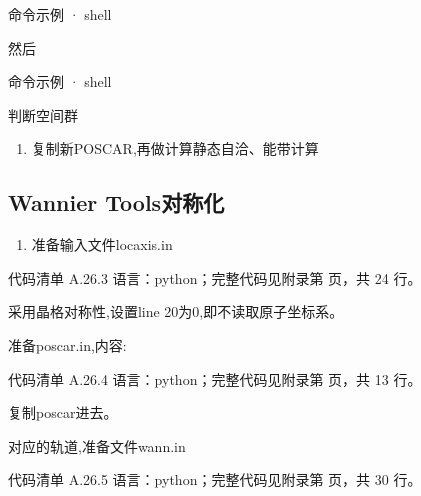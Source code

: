 \documentclass[lang=cn,scheme=chinese,color=blue,device=normal,toc=onecol,math=cm]{elegantbook}
\begin{document}
\begin{inlinecodebox}{命令示例 · shell}
\end{inlinecodebox}


然后\par


\begin{inlinecodebox}{命令示例 · shell}
\end{inlinecodebox}


判断空间群\par


\begin{enumerate}
\item 复制新POSCAR,再做计算静态自洽、能带计算
\end{enumerate}


\subsection{Wannier Tools对称化}


\begin{enumerate}
\item 准备输入文件locaxis.in
\end{enumerate}


\begin{codeindexbox}{代码清单 A.26.3}
语言：python；完整代码见附录第 \pageref{code:26:3} 页，共 24 行。
\end{codeindexbox}


采用晶格对称性,设置line 20为0,即不读取原子坐标系。\par


准备poscar.in,内容:\par


\begin{codeindexbox}{代码清单 A.26.4}
语言：python；完整代码见附录第 \pageref{code:26:4} 页，共 13 行。
\end{codeindexbox}


复制poscar进去。\par


对应的轨道,准备文件wann.in\par


\begin{codeindexbox}{代码清单 A.26.5}
语言：python；完整代码见附录第 \pageref{code:26:5} 页，共 30 行。
\end{codeindexbox}
\end{document}

